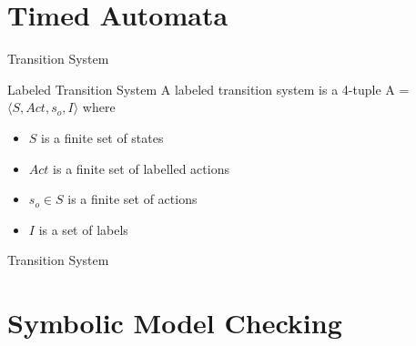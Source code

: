 
\section{Timed Automata}
\begin{frame}{Transition System}
\begin{mydef}{Labeled Transition System}
A labeled transition system is a 4-tuple A = $\langle S, Act, s_o, I \rangle$ where
\begin{itemize}
\item $S$ is a finite set of states
\item $Act$ is a finite set of labelled actions
\item $s_o \in S$ is a finite set of actions
\item $I$ is a set of labels
\end{itemize}
\end{mydef}
\end{frame}

\begin{frame}{Transition System}
\begin{figure}
\end{figure}
\end{frame}

\section{Symbolic Model Checking}

